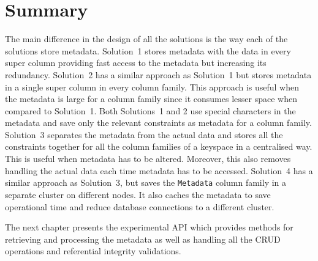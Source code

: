 \section{Summary}\label{s:Design-summary}
The main difference in the design of all the  solutions is the way each
of the solutions store metadata.   Solution~1 stores metadata with the data in
every super column providing fast access to the metadata but increasing its
redundancy.  
Solution~2 has a similar approach as Solution~1 but stores metadata in a single
super column in every column family.  This approach is useful when the metadata
is large for a column family since it consumes lesser space when compared to
Solution~1.
Both Solutions~1 and 2 use special characters in the metadata and save only the
relevant constraints as metadata for a column family.
Solution~3 separates the metadata from
the actual data and stores all the constraints together for all the column
families of a keyspace  in a centralised way.   This is useful when metadata has
to be  altered.  
Moreover, this  also removes handling the actual data each time metadata
has to be accessed.   
Solution~4 has a similar approach as Solution~3, but saves the \texttt{Metadata}
column family in a separate cluster on different nodes.   It also caches the
metadata  to save operational time and reduce database connections to a
different cluster.

The next chapter presents the  experimental \ac{API} which provides methods for
 retrieving and processing the metadata as well as handling all the \ac{CRUD}
 operations and referential integrity validations. 





